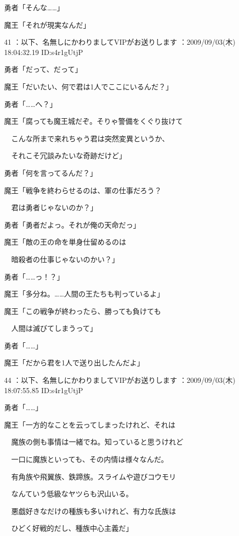 \documentclass[a4j,twocolumn]{tarticle}
\begin{document}
勇者「そんな……」\par{} 
魔王「それが現実なんだ」

	 
    
	

41 ：以下、名無しにかわりましてVIPがお送りします ：2009/09/03(木) 18:04:32.19 ID:s4r1gUtjP 


勇者「だって、だって」\par{} 
魔王「だいたい、何で君は1人でここにいるんだ？」\par{} 
勇者「……へ？」 



魔王「腐っても魔王城だぞ。そりゃ警備をくぐり抜けて\par{} 
　こんな所まで来れちゃう君は突然変異というか、\par{} 
　それこそ冗談みたいな奇跡だけど」\par{} 
勇者「何を言ってるんだ？」 



魔王「戦争を終わらせるのは、軍の仕事だろう？\par{} 
　君は勇者じゃないのか？」\par{} 
勇者「勇者だよっ。それが俺の天命だっ」 



魔王「敵の王の命を単身仕留めるのは\par{} 
　暗殺者の仕事じゃないのかい？」 



勇者「……っ！？」 



魔王「多分ね。……人間の王たちも判っているよ」 



魔王「この戦争が終わったら、勝っても負けても\par{} 
　人間は滅びてしまうって」 



勇者「……」 



魔王「だから君を1人で送り出したんだよ」 

	
    
    

44 ：以下、名無しにかわりましてVIPがお送りします ：2009/09/03(木) 18:07:55.85 ID:s4r1gUtjP 


勇者「……」 



魔王「一方的なことを云ってしまったけれど、それは\par{} 
　魔族の側も事情は一緒でね。知っていると思うけれど\par{} 
　一口に魔族といっても、その内情は様々なんだ。\par{} 
　有角族や飛翼族、鉄蹄族。スライムや遊びコウモリ\par{} 
　なんていう低級なヤツらも沢山いる。\par{} 
　悪戯好きなだけの種族も多いけれど、有力な氏族は \par{}
　ひどく好戦的だし、種族中心主義だ」 
\end{document}
